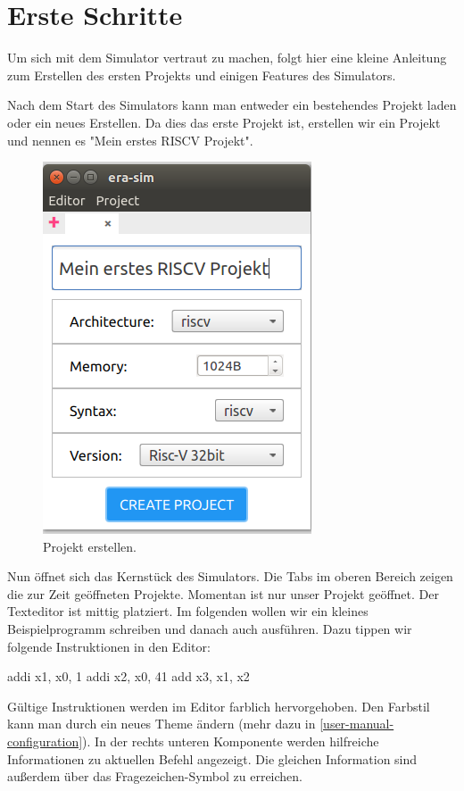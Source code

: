 
\section{Erste Schritte}


Um sich mit dem Simulator vertraut zu machen, folgt hier eine kleine Anleitung
zum Erstellen des ersten Projekts und einigen Features des Simulators.

Nach dem Start des Simulators kann man entweder ein bestehendes Projekt laden
oder ein neues Erstellen. Da dies das erste Projekt ist, erstellen wir ein
Projekt und nennen es "Mein erstes RISCV Projekt".

\begin{figure}[H]
	\centering
	\includegraphics[scale=1.0]{Images/first-steps-1.png}
	\caption{Projekt erstellen.}
\end{figure}

Nun öffnet sich das Kernstück des Simulators. Die Tabs im oberen Bereich zeigen
die zur Zeit geöffneten Projekte. Momentan ist nur unser Projekt geöffnet. Der
Texteditor ist mittig platziert. Im folgenden wollen wir ein kleines
Beispielprogramm schreiben und danach auch ausführen. Dazu tippen wir folgende
Instruktionen in den Editor:

\begin{riscv}
  addi x1, x0,  1
  addi x2, x0, 41
  add  x3, x1, x2
\end{riscv}
Gültige Instruktionen werden im Editor farblich hervorgehoben. Den Farbstil kann
man durch ein neues Theme ändern (mehr dazu in
\autoref{user-manual-configuration}). In der rechts unteren Komponente werden
hilfreiche Informationen zu aktuellen Befehl angezeigt. Die gleichen Information
sind außerdem über das Fragezeichen-Symbol zu erreichen.

